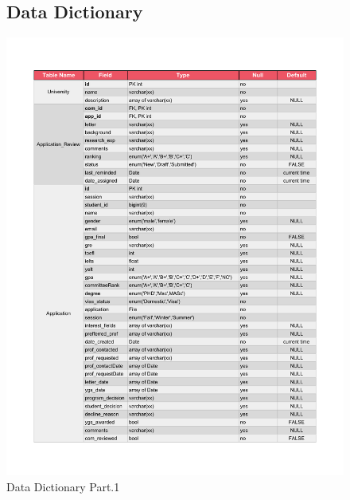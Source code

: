 \documentclass[fontsize=12pt,paper=letter,twoside]{scrartcl}
\begin{document}
\begin{figure}[!htb]
\subsection{Data Dictionary}

\begin{center}
\includegraphics[width=\textwidth, page=1]{images/data_dictionary.pdf}
\end{center}
\caption{Data Dictionary Part.1}
\label{fig:dd1}
\end{figure}

\clearpage
\newpage
\end{document}
